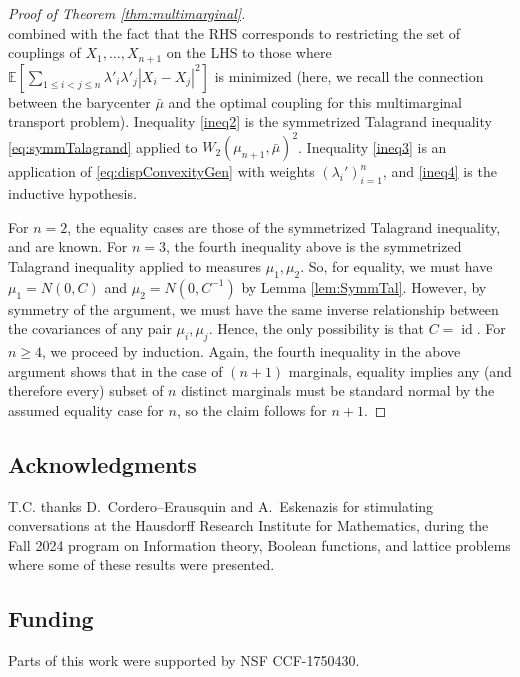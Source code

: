 \documentclass[10pt]{article}
\newcommand{\id}{\operatorname{id}}
\newcommand{\EE}{\mathbb{E}}
\begin{document}
\begin{proof}[Proof of Theorem \ref{thm:multimarginal}]
$$$$
combined with the fact that the RHS corresponds to restricting the set of couplings of $X_1,\dots,X_{n+1}$ on the LHS to those where $\EE\left[  \sum_{1 \leq i < j \leq n} \lambda'_i \lambda'_j |X_i - X_j|^2  \right]$ is minimized (here, we recall the connection between the barycenter $\bar{\mu}$ and the optimal coupling for this multimarginal transport problem).  Inequality \eqref{ineq2} is the symmetrized Talagrand inequality \eqref{eq:symmTalagrand} applied to $W_2(\mu_{n+1},\bar{\mu} )^2$.  Inequality \eqref{ineq3} is an application of \eqref{eq:dispConvexityGen} with weights $(\lambda_i')_{i=1}^n$, and \eqref{ineq4} is the inductive hypothesis. 

For $n=2$, the equality cases are those of the symmetrized Talagrand inequality, and are known.  For $n=3$, the fourth inequality above is the symmetrized Talagrand inequality applied to measures $\mu_1,\mu_2$.  So, for equality, we must have $\mu_1 = N(0,C)$ and $\mu_2= N(0,C^{-1})$ by Lemma \ref{lem:SymmTal}.  However, by symmetry of the argument, we must have the same inverse relationship between the covariances of any pair $\mu_i,\mu_j$.  Hence, the only possibility is that $C = \id$.  For $n\geq 4$, we proceed by induction.  Again, the fourth inequality in the above argument shows that in the case of $(n+1)$ marginals, equality implies any (and therefore every) subset of $n$ distinct marginals must be standard normal by the assumed equality case for $n$, so the claim follows for $n+1$.
\end{proof}


\subsection*{Acknowledgments}
T.C. thanks D.~Cordero--Erausquin and A.~Eskenazis for stimulating conversations at the Hausdorff Research Institute for Mathematics, during the Fall 2024 program on Information theory, Boolean functions, and lattice problems where some of these results were presented.

\subsection*{Funding} Parts of this work were supported by NSF CCF-1750430.
\end{document}
